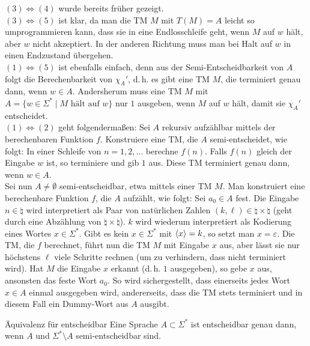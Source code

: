 \begin{Beweis}
    $(3) \iff (4)$ wurde bereits früher gezeigt.\\
    $(3) \iff (5)$ ist klar, da man die TM $M$ mit $T(M) = A$ leicht so umprogrammieren kann,
    dass sie in eine Endlosschleife geht, wenn $M$ auf $w$ hält, aber $w$ nicht akzeptiert.
    In der anderen Richtung muss man bei Halt auf $w$ in einen Endzustand übergehen.\\
    $(1) \iff (5)$ ist ebenfalls einfach, denn aus der Semi-Entscheidbarkeit von $A$ folgt
    die Berechenbarkeit von $\chi_A'$, d.\,h. es gibt eine TM $M$, die terminiert genau dann, wenn
    $w \in A$.
    Andersherum muss eine TM $M$ mit $A = \{w \in \Sigma^\ast \;|\; M \text{ hält auf } w\}$
    nur $1$ ausgeben, wenn $M$ auf $w$ hält, damit sie $\chi_A'$ entscheidet.\\
    $(1) \iff (2)$ geht folgendermaßen:
    Sei $A$ rekursiv aufzählbar mittels der berechenbaren Funktion $f$.
    Konstruiere eine TM, die $A$ semi-entscheidet, wie folgt:
    In einer Schleife von $n = 1, 2, \dotsc$ berechne $f(n)$.
    Falls $f(n)$ gleich der Eingabe $w$ ist, so terminiere und gib $1$ aus.
    Diese TM terminiert genau dann, wenn $w \in A$.\\
    Sei nun $A \not= \emptyset$ semi-entscheidbar, etwa mittels einer TM $M$.
    Man konstruiert eine berechenbare Funktion $f$, die $A$ aufzählt, wie folgt:
    Sei $a_0 \in A$ fest.
    Die Eingabe $n \in \natural$ wird interpretiert als Paar von natürlichen Zahlen
    $(k, \ell) \in \natural \times \natural$
    (geht durch eine Abzählung von $\natural \times \natural$).
    $k$ wird wiederum interpretiert als Kodierung eines Wortes $x \in \Sigma^\ast$.
    Gibt es kein $x \in \Sigma^\ast$ mit $\left\langle x\right\rangle = k$, so setzt man $x = \varepsilon$.
    Die TM, die $f$ berechnet, führt nun die TM $M$ mit Eingabe $x$ aus, aber lässt sie nur
    höchstens $\ell$ viele Schritte rechnen (um zu verhindern, dass nicht terminiert wird).
    Hat $M$ die Eingabe $x$ erkannt (d.\,h. $1$ ausgegeben), so gebe $x$ aus,
    ansonsten das feste Wort $a_0$.
    So wird sichergestellt, dass einerseits jedes Wort $x \in A$ einmal ausgegeben wird,
    andererseits, dass die TM stets terminiert und in diesem Fall ein Dummy-Wort aus $A$ ausgibt.
\end{Beweis}

\begin{Satz}{Äquivalenz für entscheidbar}
    Eine Sprache $A \subset \Sigma^\ast$ ist entscheidbar genau dann,
    wenn $A$ und $\Sigma^\ast \setminus A$ semi-entscheidbar sind.
\end{Satz}

